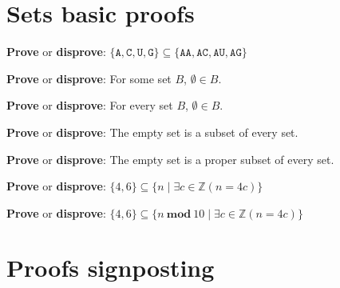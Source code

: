 \documentclass[12pt, oneside]{article}
\newcommand{\A}[0]{\texttt{A}}
\newcommand{\C}[0]{\texttt{C}}
\newcommand{\G}[0]{\texttt{G}}
\newcommand{\U}[0]{\texttt{U}}
\begin{document}
\section*{Sets basic proofs}


{\bf Prove} or {\bf  disprove}: $\{ \A,  \C,  \U,  \G\} \subseteq \{ \A\A, \A\C, \A\U, \A\G \}$ 

\vspace{150pt}

{\bf Prove} or {\bf  disprove}: For some set $B$, $\emptyset \in B$.

\vspace{150pt}

{\bf Prove} or {\bf  disprove}: For every set $B$, $\emptyset \in B$.

\vspace{150pt}

{\bf Prove} or {\bf  disprove}: The empty set is a subset of every set.

\vspace{150pt}

{\bf Prove} or {\bf  disprove}: The empty set is a proper subset of every set.

\vspace{150pt}

{\bf Prove} or {\bf  disprove}: $\{ 4, 6 \} \subseteq \{ n \mid  \exists c \in \mathbb{Z} ( n = 4c) \} $

\vspace{150pt}

{\bf Prove} or {\bf  disprove}: $\{ 4, 6 \} \subseteq \{ n ~\textbf{mod}~10 \mid  \exists c \in \mathbb{Z} ( n = 4c) \} $

\vspace{150pt}

 \vfill
\section*{Proofs signposting}


 \vfill
\end{document}
